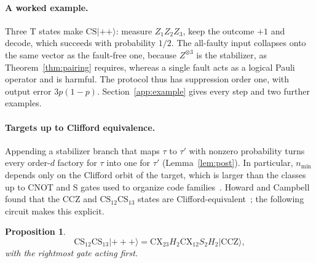 \documentclass[aps,prl,reprint,twocolumn,amsmath,amssymb,floatfix,nofootinbib,superscriptaddress]{revtex4-2}
\newtheorem{proposition}[theorem]{Proposition}
\newcommand{\CCZ}{\mathrm{CCZ}}
\newcommand{\CS}{\mathrm{CS}}
\begin{document}
\paragraph*{A worked example.}
Three T states make $\CS|{+}{+}\rangle$: measure $Z_1Z_2Z_3$, keep the outcome $+1$ and decode, which succeeds with probability $1/2$. The all-faulty input collapses onto the same vector as the fault-free one, because $Z^{\otimes3}$ is the stabilizer, as Theorem~\ref{thm:pairing} requires, whereas a single fault acts as a logical Pauli operator and is harmful. The protocol thus has suppression order one, with output error $3p(1-p)$. Section~\ref{app:example} gives every step and two further examples.

\paragraph*{Targets up to Clifford equivalence.}
Appending a stabilizer branch that maps $\tau$ to $\tau'$ with nonzero probability turns every order-$d$ factory for $\tau$ into one for $\tau'$ (Lemma~\ref{lem:post}). In particular, $n_{\min}$ depends only on the Clifford orbit of the target, which is larger than the classes up to CNOT and S gates used to organize code families~\cite{wjs}. Howard and Campbell found that the CCZ and $\CS_{12}\CS_{13}$ states are Clifford-equivalent~\cite{howardcampbell}; the following circuit makes this explicit.
\begin{proposition}\label{prop:orbit}
\begin{equation}
 \CS_{12}\CS_{13}|{+}{+}{+}\rangle=\mathrm{CX}_{23}H_2\mathrm{CX}_{12}S_2H_2|\CCZ\rangle,
 \label{eq:orbit}
\end{equation}
with the rightmost gate acting first.
\end{proposition}

%
\end{document}
